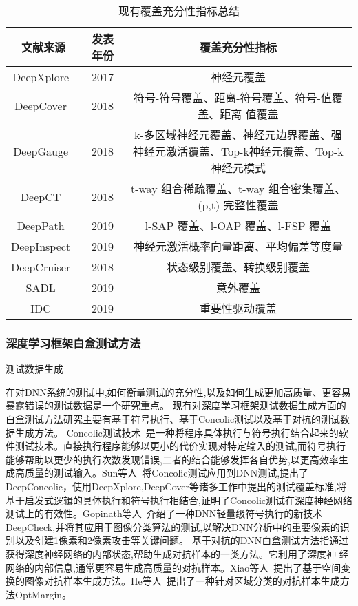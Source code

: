 \begin{table}[t]
	\small
	\centering
	\caption{现有覆盖充分性指标总结}
	\label{tab:coverage_criteria}
	\begin{tabular}{c|c|c}
		\toprule
		文献来源 & 发表年份 & 覆盖充分性指标 \\
		\midrule
		DeepXplore~\citess{Pei2019DeepXplore} & 2017 & 神经元覆盖 \\
		\midrule
	    DeepCover~\citess{Sun2018Testing} & 2018 & 符号-符号覆盖、距离-符号覆盖、符号-值覆盖、距离-值覆盖 \\
		\midrule
		DeepGauge~\citess{Ma2018DeepGauge} & 2018 & k-多区域神经元覆盖、神经元边界覆盖、强神经元激活覆盖、Top-k神经元覆盖、Top-k 神经元模式 \\
		\midrule
	    DeepCT~\citess{Ma2019DeepCT} & 2018 & t-way 组合稀疏覆盖、t-way 组合密集覆盖、(p,t)-完整性覆盖 \\
	    \midrule
	    DeepPath~\citess{Wang2019DeepPath} & 2019 & l-SAP 覆盖、l-OAP 覆盖、l-FSP 覆盖 \\
	    \midrule
	    DeepInspect~\citess{Tian2019Testing} & 2019 & 神经元激活概率向量距离、平均偏差等度量 \\
	    \midrule
	    DeepCruiser~\citess{Du2018DeepCruiser} & 2018 & 状态级别覆盖、转换级别覆盖 \\
	    \midrule
	    SADL~\citess{Kim2019Guiding} & 2019 & 意外覆盖 \\
	    \midrule
	    IDC~\citess{Gerasimou2020Importance} & 2019 & 重要性驱动覆盖 \\
		\bottomrule
	\end{tabular}
\end{table}



\subsubsection{深度学习框架白盒测试方法}


测试数据生成

在对DNN系统的测试中,如何衡量测试的充分性,以及如何生成更加高质量、更容易暴露错误的测试数据是一个研究重点。
现有对深度学习框架测试数据生成方面的白盒测试方法研究主要有基于符号执行、基于Concolic测试以及基于对抗的测试数据生成方法。
Concolic测试技术~\cite{Majumdar2007Hybrid}是一种将程序具体执行与符号执行结合起来的软件测试技术。直接执行程序能够以更小的代价实现对特定输入的测试,而符号执行能够帮助以更少的执行次数发现错误,二者的结合能够发挥各自优势,以更高效率生成高质量的测试输入。Sun等人~将Concolic测试应用到DNN测试,提出了DeepConcolic，使用DeepXplore,DeepCover等诸多工作中提出的测试覆盖标准,将基于启发式逻辑的具体执行和符号执行相结合,证明了Concolic测试在深度神经网络测试上的有效性。Gopinath等人~介绍了一种DNN轻量级符号执行的新技术DeepCheck,并将其应用于图像分类算法的测试,以解决DNN分析中的重要像素的识别以及创建1像素和2像素攻击等关键问题。
基于对抗的DNN白盒测试方法指通过获得深度神经网络的内部状态,帮助生成对抗样本的一类方法。它利用了深度神
经网络的内部信息,通常更容易生成高质量的对抗样本。Xiao等人~提出了基于空间变换的图像对抗样本生成方法。He等人~提出了一种针对区域分类的对抗样本生成方法OptMargin。



